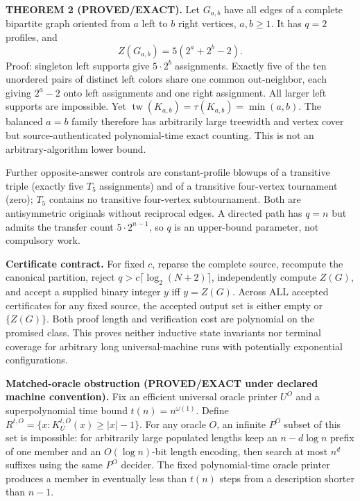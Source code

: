 \documentclass[11pt]{article}
\begin{document}
\textbf{THEOREM 2 (PROVED/EXACT).} Let $G_{a,b}$ have all edges of a complete bipartite graph oriented from $a$ left to $b$ right vertices, $a,b\ge1$. It has $q=2$ profiles, and
\[
\boxed{Z(G_{a,b})=5(2^a+2^b-2).}
\]
Proof: singleton left supports give $5\cdot2^b$ assignments. Exactly five of the ten unordered pairs of distinct left colors share one common out-neighbor, each giving $2^a-2$ onto left assignments and one right assignment. All larger left supports are impossible. Yet $\operatorname{tw}(K_{a,b})=\tau(K_{a,b})=\min(a,b)$. The balanced $a=b$ family therefore has arbitrarily large treewidth and vertex cover but source-authenticated polynomial-time exact counting. This is not an arbitrary-algorithm lower bound.

Further opposite-answer controls are constant-profile blowups of a transitive triple (exactly five $T_5$ assignments) and of a transitive four-vertex tournament (zero); $T_5$ contains no transitive four-vertex subtournament. Both are antisymmetric originals without reciprocal edges. A directed path has $q=n$ but admits the transfer count $5\cdot2^{n-1}$, so $q$ is an upper-bound parameter, not compulsory work.

\textbf{Certificate contract.} For fixed $c$, reparse the complete source, recompute the canonical partition, reject $q>c\lceil\log_2(N+2)\rceil$, independently compute $Z(G)$, and accept a supplied binary integer $y$ iff $y=Z(G)$. Across ALL accepted certificates for any fixed source, the accepted output set is either empty or $\{Z(G)\}$. Both proof length and verification cost are polynomial on the promised class. This proves neither inductive state invariants nor terminal coverage for arbitrary long universal-machine runs with potentially exponential configurations.

\textbf{Matched-oracle obstruction (PROVED/EXACT under declared machine convention).} Fix an efficient universal oracle printer $U^O$ and a superpolynomial time bound $t(n)=n^{\omega(1)}$. Define $R^{t,O}=\{x:K_U^{t,O}(x)\ge |x|-1\}$. For any oracle $O$, an infinite $P^O$ subset of this set is impossible: for arbitrarily large populated lengths keep an $n-d\log n$ prefix of one member and an $O(\log n)$-bit length encoding, then search at most $n^d$ suffixes using the same $P^O$ decider. The fixed polynomial-time oracle printer produces a member in eventually less than $t(n)$ steps from a description shorter than $n-1$.
\end{document}
